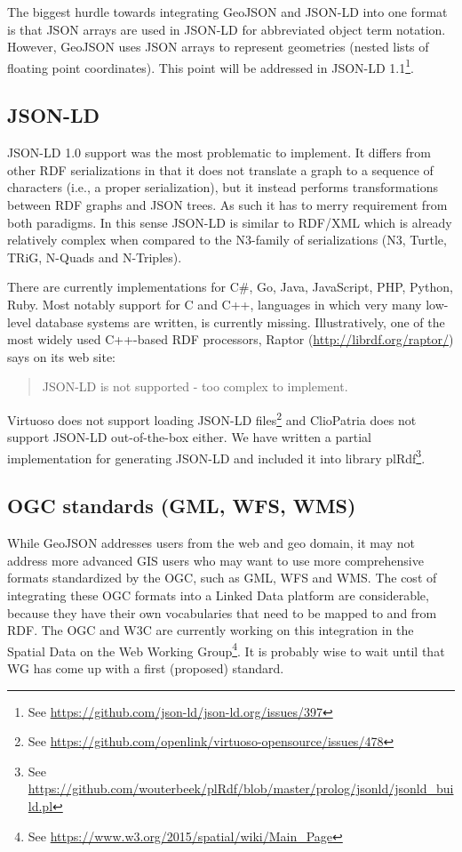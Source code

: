 \documentclass[a4paper]{scrartcl}
\begin{document}
The biggest hurdle towards integrating GeoJSON and JSON-LD into one
format is that JSON arrays are used in JSON-LD for abbreviated object
term notation.  However, GeoJSON uses JSON arrays to represent
geometries (nested lists of floating point coordinates).
This point will be addressed in JSON-LD 1.1\footnote{See \url{https://github.com/json-ld/json-ld.org/issues/397}}.


\subsection{JSON-LD}
\label{sec:jsonld}

JSON-LD 1.0 support was the most problematic to implement.  It differs
from other RDF serializations in that it does not translate a graph to
a sequence of characters (i.e., a proper serialization), but it
instead performs transformations between RDF graphs and JSON trees.
As such it has to merry requirement from both paradigms.  In this
sense JSON-LD is similar to RDF/XML which is already relatively
complex when compared to the N3-family of serializations (N3, Turtle,
TRiG, N-Quads and N-Triples).

There are currently implementations for C\#, Go, Java, JavaScript,
PHP, Python, Ruby.  Most notably support for C and C++, languages in
which very many low-level database systems are written, is currently
missing.  Illustratively, one of the most widely used C++-based RDF
processors, Raptor (\url{http://librdf.org/raptor/}) says on its web
site:

\begin{quote}
  JSON-LD is not supported - too complex to implement.
\end{quote}

Virtuoso does not support loading JSON-LD files\footnote{See
  \url{https://github.com/openlink/virtuoso-opensource/issues/478}}
and ClioPatria does not support JSON-LD out-of-the-box either.  We
have written a partial implementation for generating JSON-LD and
included it into library plRdf\footnote{See
  \url{https://github.com/wouterbeek/plRdf/blob/master/prolog/jsonld/jsonld_build.pl}}.


\subsection{OGC standards (GML, WFS, WMS)}

While GeoJSON addresses users from the web and geo domain, it may not
address more advanced GIS users who may want to use more comprehensive
formats standardized by the OGC, such as GML, WFS and WMS.  The cost
of integrating these OGC formats into a Linked Data platform are
considerable, because they have their own vocabularies that need to be
mapped to and from RDF.  The OGC and W3C are currently working on this
integration in the Spatial Data on the Web Working Group\footnote{See
  \url{https://www.w3.org/2015/spatial/wiki/Main_Page}}.  It is
probably wise to wait until that WG has come up with a first
(proposed) standard.
\end{document}
